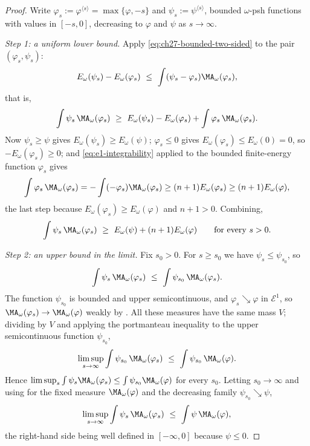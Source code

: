 \begin{proof}
Write $\varphi_s:=\varphi^{\langle s\rangle}=\max\{\varphi,-s\}$ and
$\psi_s:=\psi^{\langle s\rangle}$, bounded $\omega$-psh functions with
values in $[-s,0]$, decreasing to $\varphi$ and $\psi$ as
$s\to\infty$.

\emph{Step 1: a uniform lower bound.}
Apply \eqref{eq:ch27-bounded-two-sided} to the pair
$(\varphi_s,\psi_s)$:
\[
 E_\omega(\psi_s)-E_\omega(\varphi_s)
 \ \leq\ \int(\psi_s-\varphi_s)\MA_\omega(\varphi_s),
\]
that is,
\[
 \int\psi_s\,\MA_\omega(\varphi_s)
 \ \geq\ E_\omega(\psi_s)-E_\omega(\varphi_s)
        +\int\varphi_s\,\MA_\omega(\varphi_s).
\]
Now $\psi_s\geq\psi$ gives $E_\omega(\psi_s)\geq E_\omega(\psi)$;
$\varphi_s\leq0$ gives $E_\omega(\varphi_s)\leq E_\omega(0)=0$, so
$-E_\omega(\varphi_s)\geq0$; and
\eqref{eq:e1-integrability} applied to the bounded finite-energy function
$\varphi_s$ gives
\[
 \int\varphi_s\,\MA_\omega(\varphi_s)
 =-\int(-\varphi_s)\MA_\omega(\varphi_s)
 \geq(n+1)E_\omega(\varphi_s)\geq(n+1)E_\omega(\varphi),
\]
the last step because $E_\omega(\varphi_s)\geq E_\omega(\varphi)$ and
$n+1>0$.  Combining,
\begin{equation}\label{eq:ch27-uniform-lower-bound}
 \int\psi_s\,\MA_\omega(\varphi_s)
 \ \geq\ E_\omega(\psi)+(n+1)E_\omega(\varphi)
 \qquad\text{for every }s>0 .
\end{equation}

\emph{Step 2: an upper bound in the limit.}
Fix $s_0>0$.  For $s\geq s_0$ we have $\psi_s\leq\psi_{s_0}$, so
\[
 \int\psi_s\,\MA_\omega(\varphi_s)
 \ \leq\ \int\psi_{s_0}\,\MA_\omega(\varphi_s).
\]
The function $\psi_{s_0}$ is bounded and upper semicontinuous, and
$\varphi_s\searrow\varphi$ in $\mathcal E^1$, so
$\MA_\omega(\varphi_s)\to\MA_\omega(\varphi)$ weakly by
.  All these measures have the same mass
$V$; dividing by $V$ and applying the portmanteau inequality
 to the upper semicontinuous function
$\psi_{s_0}$,
\[
 \limsup_{s\to\infty}\int\psi_{s_0}\,\MA_\omega(\varphi_s)
 \ \leq\ \int\psi_{s_0}\,\MA_\omega(\varphi).
\]
Hence
$\limsup_s\int\psi_s\MA_\omega(\varphi_s)
 \leq\int\psi_{s_0}\MA_\omega(\varphi)$ for every $s_0$.  Letting
$s_0\to\infty$ and using  for the
fixed measure $\MA_\omega(\varphi)$ and the decreasing family
$\psi_{s_0}\searrow\psi$,
\begin{equation}\label{eq:ch27-upper-limsup}
 \limsup_{s\to\infty}\int\psi_s\,\MA_\omega(\varphi_s)
 \ \leq\ \int\psi\,\MA_\omega(\varphi),
\end{equation}
the right-hand side being well defined in $[-\infty,0]$ because
$\psi\leq0$.


\end{proof}
